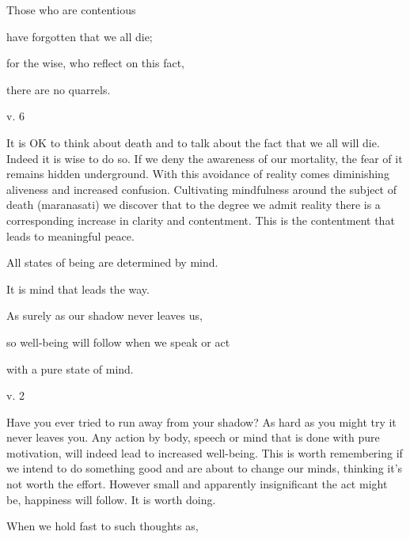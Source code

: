 \documentclass[a4paper,portrait,12pt]{article}
\begin{document}
Those who are contentious 


have forgotten that we all die;


for the wise, who reflect on this fact, 


there are no quarrels.





v. 6 





It is OK to think about death and to talk about the fact that we all will die. Indeed it is wise to do so. If we deny the awareness of our mortality, the fear of it remains hidden underground. With this avoidance of reality comes diminishing aliveness and increased confusion. Cultivating mindfulness around the subject of death (maranasati) we discover that to the degree we admit reality there is a corresponding increase in clarity and contentment. This is the contentment that leads to meaningful peace.





\texttt{}

\texttt{}

\texttt{}

All states of being are determined by mind.

It is mind that leads the way.

As surely as our shadow never leaves us,

so well-being will follow when we speak or act

with a pure state of mind.


v. 2





Have you ever tried to run away from your shadow? As hard as you might try it never leaves you. Any action by body, speech or mind that is done with pure motivation, will indeed lead to increased well-being. This is worth remembering if we intend to do something good and are about to change our minds, thinking it's not worth the effort. However small and apparently insignificant the act might be, happiness will follow. It is worth doing.














When we hold fast to such thoughts as,
\end{document}
